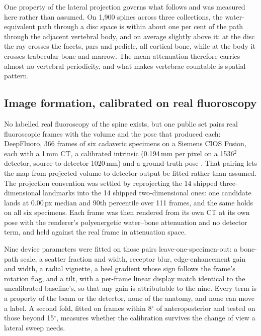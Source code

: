 \documentclass[11pt,letterpaper]{article}
\begin{document}
One property of the lateral projection governs what follows and was measured here rather than assumed.
On 1{,}900 spines across three collections, the water-equivalent path through a disc space is within
about one per cent of the path through the adjacent vertebral body, and on average slightly above it: at
the disc the ray crosses the facets, pars and pedicle, all cortical bone, while at the body it crosses
trabecular bone and marrow. The mean attenuation therefore carries almost no vertebral periodicity, and
what makes vertebrae countable is spatial pattern.

\subsection*{Image formation, calibrated on real fluoroscopy}
No labelled real fluoroscopy of the spine exists, but one public set pairs real fluoroscopic frames
with the volume and the pose that produced each: DeepFluoro, 366 frames of six cadaveric specimens on a
Siemens CIOS Fusion, each with a 1\,mm CT, a calibrated intrinsic (0.194\,mm per pixel on a 1536$^2$
detector, source-to-detector 1020\,mm) and a ground-truth pose \citep{grupp2020}. That pairing lets
the map from projected volume to detector output be fitted rather than assumed. The projection
convention was settled by reprojecting the 14 shipped three-dimensional landmarks into the 14 shipped
two-dimensional ones: one candidate lands at 0.00\,px median and 90th percentile over 111 frames, and
the same holds on all six specimens. Each frame was then rendered from its own CT at its own pose with
the renderer's polyenergetic water--bone attenuation and no detector term, and held against the real
frame in attenuation space.

Nine device parameters were fitted on those pairs leave-one-specimen-out: a bone-path scale, a scatter
fraction and width, receptor blur, edge-enhancement gain and width, a radial vignette, a heel gradient
whose sign follows the frame's rotation flag, and a tilt, with a per-frame linear display match
identical to the uncalibrated baseline's, so that any gain is attributable to the nine. Every term is
a property of the beam or the detector, none of the anatomy, and none can move a label. A second fold,
fitted on frames within 8$^\circ$ of anteroposterior and tested on those beyond 15$^\circ$, measures
whether the calibration survives the change of view a lateral sweep needs.
\end{document}
